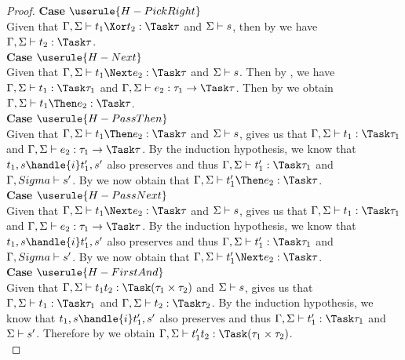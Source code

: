 \begin{proof}
  \noindent\textbf{Case} $\userule{H-PickRight}$\\
  \indent  Given that
  $\Gamma,\Sigma\infers t_1\Xor t_2:\Task\tau$ and $\Sigma\vdash s$, then by
   we have $\Gamma,\Sigma\infers t_2:\Task \tau$. \\

  \noindent\textbf{Case} $\userule{H-Next}$\\
  \indent  Given that
  $\Gamma,\Sigma\infers t_1\Next e_2 :\Task\tau$ and $\Sigma\vdash s$. Then by
  , we have $\Gamma,\Sigma\infers t_1:\Task\tau_1$ and
  $\Gamma,\Sigma\infers e_2:\tau_1\to\Task\tau$. Then by  we
  obtain $\Gamma,\Sigma\infers t_1\Then e_2:\Task\tau$.\\

  \noindent\textbf{Case} $\userule{H-PassThen}$\\
  \indent  Given that
  $\Gamma,\Sigma\infers t_1\Then e_2:\Task\tau$ and $\Sigma\vdash s$,
   gives us that $\Gamma,\Sigma\infers t_1:\Task\tau_1$ and
  $\Gamma,\Sigma\infers e_2:\tau_1\to\Task\tau$. By the induction hypothesis, we
  know that $t_1,s\handle{i}t_1',s'$ also preserves and thus
  $\Gamma,\Sigma\infers t_1':\Task\tau_1$ and $\Gamma,Sigma\vdash s'$. By
   we now obtain that
  $\Gamma,\Sigma\infers t_1'\Then e_2:\Task\tau$. \\

  \noindent\textbf{Case} $\userule{H-PassNext}$\\
  \indent  Given that
  $\Gamma,\Sigma\infers t_1\Next e_2:\Task\tau$ and $\Sigma\vdash s$,
   gives us that $\Gamma,\Sigma\infers t_1:\Task\tau_1$ and
  $\Gamma,\Sigma\infers e_2:\tau_1\to\Task\tau$. By the induction hypothesis, we
  know that $t_1,s\handle{i}t_1',s'$ also preserves and thus
  $\Gamma,\Sigma\infers t_1':\Task\tau_1$ and $\Gamma,Sigma\vdash s'$. By
   we now obtain that
  $\Gamma,\Sigma\infers t_1'\Next e_2:\Task\tau$. \\

  \noindent\textbf{Case} $\userule{H-FirstAnd}$\\
  \indent  Given that
  $\Gamma,\Sigma\infers t_1\And t_2:\Task(\tau_1\times\tau_2)$ and
  $\Sigma\vdash s$,  gives us that
  $\Gamma,\Sigma\infers t_1:\Task\tau_1$ and
  $\Gamma,\Sigma\infers t_2:\Task\tau_2$. By the induction hypothesis, we know
  that $t_1,s\handle{i}t_1',s'$ also preserves and thus
  $\Gamma,\Sigma\infers t_1':\Task\tau_1$ and $\Sigma\vdash s'$. Therefore by
   we obtain
  $\Gamma,\Sigma\infers t_1'\And t_2:\Task(\tau_1\times\tau_2)$.\\


\end{proof}
